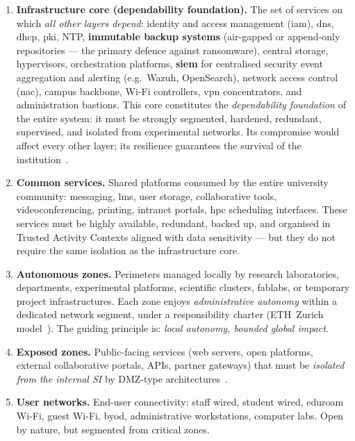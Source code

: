\begin{enumerate}
    \item \textbf{Infrastructure core (dependability foundation).}
    The set of services on which \emph{all other layers depend}: identity
    and access management (\gls{iam}), \gls{dns}, \gls{dhcp}, \gls{pki}, NTP,
    \textbf{immutable backup systems} (air-gapped or append-only
    repositories --- the primary defence against ransomware),
    central storage, hypervisors, orchestration platforms,
    \textbf{\gls{siem}} for centralised security event aggregation
    and alerting (e.g.\ Wazuh, OpenSearch),
    network access control (\gls{nac}),
    campus backbone, Wi-Fi controllers, \gls{vpn} concentrators,
    and administration bastions. This core constitutes the
    \emph{dependability foundation} of the entire system: it must be
    strongly segmented, hardened, redundant, supervised,
    and isolated from experimental networks. Its compromise would affect
    every other layer; its resilience guarantees the survival of the
    institution~\cite{nist-sp800-160v2,nist-csf}.

    \item \textbf{Common services.}
    Shared platforms consumed by the entire university community:
    messaging, \gls{lms}, user storage, collaborative tools, videoconferencing,
    printing, intranet portals, \gls{hpc} scheduling interfaces. These services
    must be highly available, redundant, backed up, and organised in
    Trusted Activity Contexts aligned with data sensitivity --- but they
    do not require the same isolation as the infrastructure core.

    \item \textbf{Autonomous zones.}
    Perimeters managed locally by research laboratories, departments,
    experimental platforms, scientific clusters, fablabs, or temporary
    project infrastructures. Each zone enjoys \emph{administrative
    autonomy} within a dedicated network segment, under a responsibility
    charter (ETH~Zurich model~\cite{eth-admin-agreement}). The guiding
    principle is: \emph{local autonomy, bounded global impact}.

    \item \textbf{Exposed zones.}
    Public-facing services (web servers, open platforms, external
    collaborative portals, APIs, partner gateways) that must be
    \emph{isolated from the internal SI} by DMZ-type
    architectures~\cite{nist-sp800-53}.

    \item \textbf{User networks.}
    End-user connectivity: staff wired, student wired, \gls{eduroam} Wi-Fi,
    guest Wi-Fi, \gls{byod}, administrative workstations, computer labs. Open
    by nature, but segmented from critical zones.
\end{enumerate}

